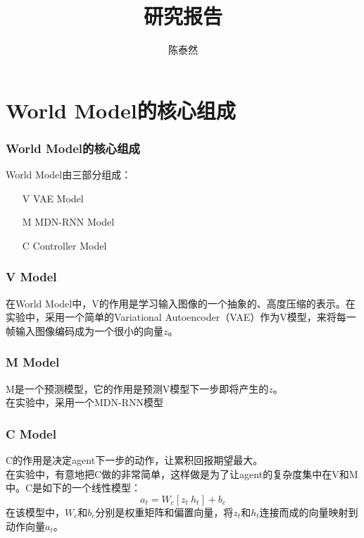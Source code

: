 \documentclass{beamer}
\title{研究报告}
\author{陈泰然}
\institute{USTC nelslip}
\begin{document}
\frame{\titlepage}



\section{World Model的核心组成}

\begin{frame}
	\frametitle{World Model的核心组成}
	World Model由三部分组成：
	\begin{itemize}
		\item[V] VAE Model
		\item[M] MDN-RNN Model
		\item[C] Controller Model
	\end{itemize}
\end{frame}

\begin{frame}
	\frametitle{V Model}
	在World Model中，V的作用是学习输入图像的一个抽象的、高度压缩的表示。在实验中，采用一个简单的Variational Autoencoder（VAE）作为V模型，来将每一帧输入图像编码成为一个很小的向量$z$。
\end{frame}

\begin{frame}
	\frametitle{M Model}
	M是一个预测模型，它的作用是预测V模型下一步即将产生的$z$。\\
	在实验中，采用一个MDN-RNN模型
\end{frame}

\begin{frame}
	\frametitle{C Model}
	C的作用是决定agent下一步的动作，让累积回报期望最大。\\
	在实验中，有意地把C做的非常简单，这样做是为了让agent的复杂度集中在V和M中。C是如下的一个线性模型：
	\begin{equation}
		a_t=W_c[z_t\ h_t]+b_c
	\end{equation}
	在该模型中，$W_c$和$b_c$分别是权重矩阵和偏置向量，将$z_t$和$h_t$连接而成的向量映射到动作向量$a_t$。
\end{frame}
\end{document}

